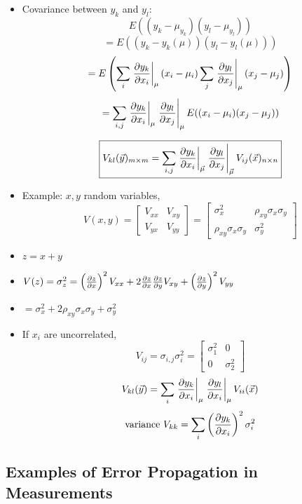 \begin{itemize}
      \item Covariance between $y_k$ and $y_l$:
            \[ E((y_k - \mu_{y_k})(y_l - \mu_{y_l})) \]
            \[ = E((y_k-y_k(\mu))(y_l - y_l(\mu))) \]
            \[ = E\left( \sum_i \left. \pdv{y_k}{x_i}\right|_{\mu} (x_i - \mu_i) \sum_j \left. \pdv{y_l}{x_j}\right|_{\mu} (x_j - \mu_j) \right) \]
            \[ = \sum_{i,j} \left. \pdv{y_k}{x_i}\right|_{\mu}  \left. \pdv{y_l}{x_j} \right|_{\mu} E((x_i - \mu_i)(x_j - \mu_j)) \]

            \[ \boxed{ V_{kl}(\vec{y})_{m \times m} = \sum_{i,j} \left. \pdv{y_k}{x_i}\right|_{\vec{\mu}}  \left. \pdv{y_l}{x_j} \right|_{\vec{\mu}} V_{ij}(\vec{x})_{n \times n} }\]

      \item Example: $x, y$ random variables,
            \[ V(x,y) = \begin{bmatrix}
                        V_{xx} & V_{xy} \\[6pt]
                        V_{yx} & V_{yy}
                  \end{bmatrix} = \begin{bmatrix}
                        \sigma_x^2                  & \rho_{xy} \sigma_x \sigma_y \\[6pt]
                        \rho_{xy} \sigma_x \sigma_y & \sigma_y^2
                  \end{bmatrix} \]
      \item $z = x + y$
      \item $V(z) = \sigma_z^2 = \left(\pdv{z}{x} \right)^2 V_{xx} + 2  \pdv{z}{x} \pdv{z}{y} V_{xy} + \left(\pdv{z}{y} \right)^2 V_{yy}$
      \item $ = \sigma_x^2 + 2 \rho_{xy} \sigma_x \sigma_y + \sigma_y^2$
      \item If $x_i$ are uncorrelated,
            \[ V_{ij} = \sigma_{i,j} \sigma_{i}^2 = \begin{bmatrix}
                        \sigma_1^2 & 0          \\[6pt]
                        0          & \sigma_2^2
                  \end{bmatrix} \]
            \[ V_{kl}(\vec{y}) = \sum_i \left. \pdv{y_k}{x_i}\right|_{\mu}  \left. \pdv{y_l}{x_i} \right|_{\mu} V_{ii}(\vec{x}) \]
            \[ \text{variance } V_{kk} = \sum_i \left(\pdv{y_k}{x_i} \right)^2 \sigma_i^2 \]
\end{itemize}

\subsection{Examples of Error Propagation in Measurements}

